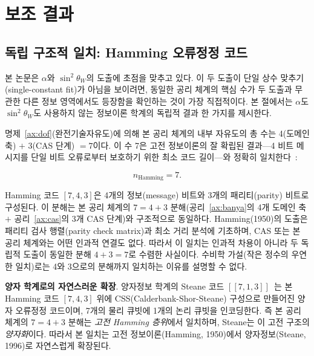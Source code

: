 \documentclass[entropy,article,submit,pdftex,oneauthor]{Definitions/mdpi}
\begin{document}

\section{보조 결과}
\label{sec:auxiliary}

\subsection{독립 구조적 일치: Hamming 오류정정 코드}
\label{sec:predictions}

본 논문은 $\alpha$와 $\sin^2\theta_W$의 도출에 초점을 맞추고 있다. 이 두 도출이 단일 상수 맞추기(single-constant fit)가 아님을 보이려면, 동일한 공리 체계의 핵심 수가 두 도출과 무관한 다른 정보 영역에서도 등장함을 확인하는 것이 가장 직접적이다. 본 절에서는 $\alpha$도 $\sin^2\theta_W$도 사용하지 않는 정보이론 학계의 독립적 결과 한 가지를 제시한다.

명제~\ref{ax:dof}(완전기술자유도)에 의해 본 공리 체계의 내부 자유도의 총 수는 4(도메인 축) $+$ 3(CAS 단계) $= 7$이다. 이 수 7은 고전 정보이론의 잘 확립된 결과---4 비트 메시지를 단일 비트 오류로부터 보호하기 위한 최소 코드 길이---와 정확히 일치한다~\cite{hamming1950}:
\begin{linenomath}
\begin{equation}
n_{\mathrm{Hamming}} = 7.
\end{equation}
\end{linenomath}
Hamming 코드 $[7, 4, 3]$은 4개의 정보(message) 비트와 3개의 패리티(parity) 비트로 구성된다. 이 분해는 본 공리 체계의 $7 = 4 + 3$ 분해(공리~\ref{ax:banya}의 4개 도메인 축 $+$ 공리~\ref{ax:cas}의 3개 CAS 단계)와 구조적으로 동일하다. Hamming(1950)의 도출은 패리티 검사 행렬(parity check matrix)과 최소 거리 분석에 기초하며, CAS 또는 본 공리 체계와는 어떤 인과적 연결도 없다. 따라서 이 일치는 인과적 차용이 아니라 두 독립적 도출이 동일한 분해 $4+3=7$로 수렴한 사실이다. 수비학 가설(작은 정수의 우연한 일치)로는 4와 3으로의 분해까지 일치하는 이유를 설명할 수 없다.

\textbf{양자 학계로의 자연스러운 확장}. 양자정보 학계의 Steane 코드 $[[7,1,3]]$~\cite{steane1996}는 본 Hamming 코드 $[7,4,3]$ 위에 CSS(Calderbank-Shor-Steane) 구성으로 만들어진 양자 오류정정 코드이며, 7개의 물리 큐빗에 1개의 논리 큐빗을 인코딩한다. 즉 본 공리 체계의 $7 = 4+3$ 분해는 \emph{고전 Hamming 층위}에서 일치하며, Steane는 이 고전 구조의 \emph{양자화}이다. 따라서 본 일치는 고전 정보이론(Hamming, 1950)에서 양자정보(Steane, 1996)로 자연스럽게 확장된다.
\end{document}
